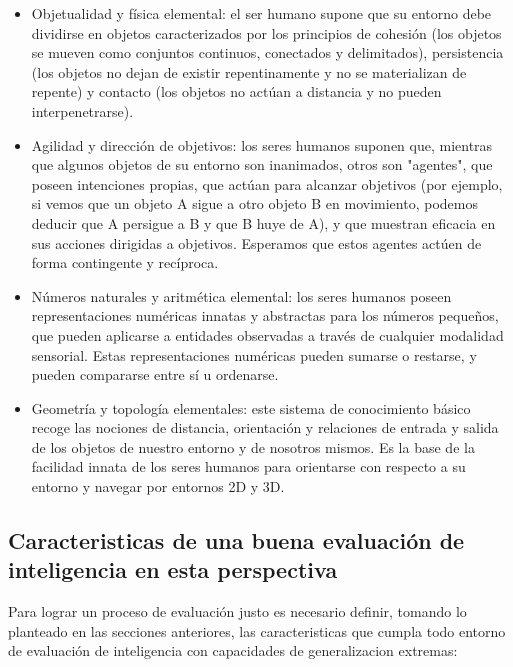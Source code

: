 \begin{itemize}

\item Objetualidad y física elemental: el ser humano supone que su entorno debe dividirse en objetos caracterizados por los principios de cohesión (los objetos se mueven como conjuntos continuos, conectados y delimitados), persistencia (los objetos no dejan de existir repentinamente y no se materializan de repente) y contacto (los objetos no actúan a distancia y no pueden interpenetrarse).

\item Agilidad y dirección de objetivos: los seres humanos suponen que, mientras que algunos objetos de su entorno son inanimados, otros son "agentes", que poseen intenciones propias, que actúan para alcanzar objetivos (por ejemplo, si vemos que un objeto A sigue a otro objeto B en movimiento, podemos deducir que A persigue a B y que B huye de A), y que muestran eficacia en sus acciones dirigidas a objetivos. Esperamos que estos agentes actúen de forma contingente y recíproca.

\item Números naturales y aritmética elemental: los seres humanos poseen representaciones numéricas innatas y abstractas para los números pequeños, que pueden aplicarse a entidades observadas a través de cualquier modalidad sensorial. Estas representaciones numéricas pueden sumarse o restarse, y pueden compararse entre sí u ordenarse.

\item Geometría y topología elementales: este sistema de conocimiento básico recoge las nociones de distancia, orientación y relaciones de entrada y salida de los objetos de nuestro entorno y de nosotros mismos. Es la base de la facilidad innata de los seres humanos para orientarse con respecto a su entorno y navegar por entornos 2D y 3D.
\end{itemize}


\subsection{Caracteristicas de una buena evaluación de inteligencia en esta perspectiva}

Para lograr un proceso de evaluación justo es necesario definir, tomando lo planteado en las secciones anteriores, las caracteristicas que cumpla todo entorno de evaluación de inteligencia con capacidades de generalizacion extremas:

